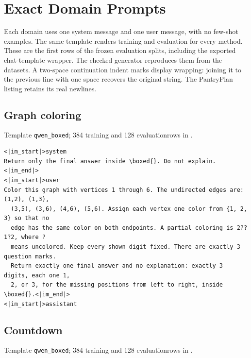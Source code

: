 \documentclass{article}
\newcommand{\1}{\mathbf 1}
\theoremstyle{remark}
\theoremstyle{definition}
\theoremstyle{plain}
\begin{document}
\section{Exact Domain Prompts}
\label{app:prompts}

Each domain uses one system message and one user message, with no few-shot
examples. The same template renders training and evaluation for every
method. These are the first rows of the frozen evaluation splits, including
the exported chat-template wrapper. The checked generator
 reproduces them from the datasets.
A two-space continuation indent marks display wrapping: joining it to the
previous line with one space recovers the original string. The PantryPlan
listing retains its real newlines.


\filbreak
\subsection{Graph coloring}
\label{app:prompt-graph}

\noindent Template \texttt{qwen\_boxed}; 384 training and 128 evaluation\newline rows in .

\begin{Verbatim}[fontsize=\scriptsize,frame=single,framesep=4pt,rulecolor=\color{black!25},samepage=true]
<|im_start|>system
Return only the final answer inside \boxed{}. Do not explain.<|im_end|>
<|im_start|>user
Color this graph with vertices 1 through 6. The undirected edges are: (1,2), (1,3),
  (3,5), (3,6), (4,6), (5,6). Assign each vertex one color from {1, 2, 3} so that no
  edge has the same color on both endpoints. A partial coloring is 2??1?2, where ?
  means uncolored. Keep every shown digit fixed. There are exactly 3 question marks.
  Return exactly one final answer and no explanation: exactly 3 digits, each one 1,
  2, or 3, for the missing positions from left to right, inside \boxed{}.<|im_end|>
<|im_start|>assistant
\end{Verbatim}

\filbreak
\subsection{Countdown}
\label{app:prompt-countdown}

\noindent Template \texttt{qwen\_boxed}; 384 training and 128 evaluation\newline rows in .
\end{document}
